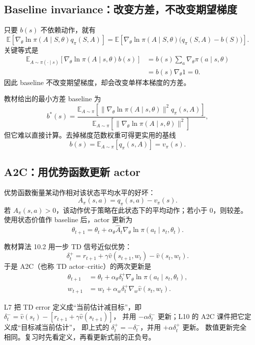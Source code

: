 \documentclass[11pt,a4paper,fontset=fandol]{ctexart}
\newcommand{\E}{\mathbb{E}}
\begin{document}
\subsection{Baseline invariance：改变方差，不改变期望梯度}

只要 \(b(s)\) 不依赖动作，就有
\[
\boxed{
\E\!\left[
\nabla_\theta\ln\pi(A\mid S,\theta)q_\pi(S,A)
\right]
=
\E\!\left[
\nabla_\theta\ln\pi(A\mid S,\theta)
\bigl(q_\pi(S,A)-b(S)\bigr)
\right]}.
\]
关键等式是
\[
\begin{aligned}
\E_{A\sim\pi(\cdot\mid s)}
[\nabla_\theta\ln\pi(A\mid s,\theta)b(s)]
&=b(s)\sum_a\nabla_\theta\pi(a\mid s,\theta)\\
&=b(s)\nabla_\theta 1=0.
\end{aligned}
\]
因此 baseline 不改变期望梯度，却会改变单样本梯度的方差。

教材给出的最小方差 baseline 为
\[
b^*(s)=
\frac{
\E_{A\sim\pi}
[\|\nabla_\theta\ln\pi(A\mid s,\theta)\|^2q_\pi(s,A)]}
{\E_{A\sim\pi}
[\|\nabla_\theta\ln\pi(A\mid s,\theta)\|^2]},
\]
但它难以直接计算。去掉梯度范数权重可得更实用的基线
\[
b(s)=\E_{A\sim\pi}[q_\pi(s,A)]=v_\pi(s).
\]

\subsection{A2C：用优势函数更新 actor}

优势函数衡量某动作相对该状态平均水平的好坏：
\[
\boxed{
A_\pi(s,a)=q_\pi(s,a)-v_\pi(s)}.
\]
若 \(A_\pi(s,a)>0\)，该动作优于策略在此状态下的平均动作；若小于 \(0\)，则较差。
使用状态价值作 baseline 后，actor 更新为
\[
\theta_{t+1}
=\theta_t+\alpha_\theta
\hat A_t\nabla_\theta
\ln\pi(a_t\mid s_t,\theta_t).
\]

教材算法 10.2 用一步 TD 信号近似优势：
\[
\boxed{
\delta_t^+
=r_{t+1}+\gamma\hat v(s_{t+1},w_t)
-\hat v(s_t,w_t)}.
\]
于是 A2C（也称 TD actor--critic）的两次更新是
\[
\boxed{
\begin{aligned}
\theta_{t+1}
&=\theta_t+\alpha_\theta\delta_t^+
\nabla_\theta\ln\pi(a_t\mid s_t,\theta_t),\\
w_{t+1}
&=w_t+\alpha_w\delta_t^+
\nabla_w\hat v(s_t,w_t).
\end{aligned}}
\]

\begin{warningbox}
L7 把 TD error 定义成“当前估计减目标”，即
\(\delta_t^-=\hat v(s_t)-[r_{t+1}+\gamma\hat v(s_{t+1})]\)，
并用 \(-\alpha\delta_t^-\) 更新；L10 的 A2C 课件把它定义成“目标减当前估计”，
即上式的 \(\delta_t^+=-\delta_t^-\)，并用 \(+\alpha\delta_t^+\) 更新。
数值更新完全相同。复习时先看定义，再看更新式前的正负号。
\end{warningbox}
\end{document}
